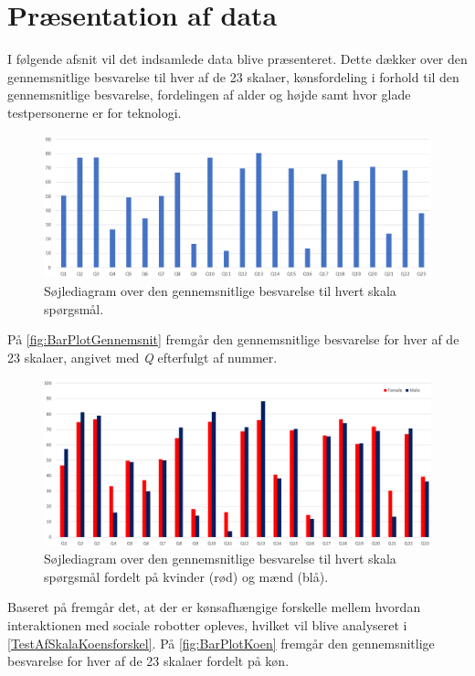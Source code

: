 \section{Præsentation af data}
\label{TestAfSkalaPraesentationAfData}
%
I følgende afsnit vil det indsamlede data blive præsenteret. Dette dækker over den gennemsnitlige besvarelse til hver af de 23 skalaer, kønsfordeling i forhold til den gennemsnitlige besvarelse, fordelingen af alder og højde samt hvor glade testpersonerne er for teknologi. 
%
\begin{figure}[H]
\centering
\includegraphics[width = \textwidth]{Figure/DatabehandlingSkalaer/BarPlotRaaData} 
\caption{Søjlediagram over den gennemsnitlige besvarelse til hvert skala spørgsmål.}
\label{fig:BarPlotGennemsnit}
\end{figure}
\noindent
%
På \autoref{fig:BarPlotGennemsnit} fremgår den gennemsnitlige besvarelse for hver af de 23 skalaer, angivet med \textit{Q} efterfulgt af nummer.
%
\begin{figure}[H]
\centering
\includegraphics[width = \textwidth]{Figure/DatabehandlingSkalaer/KoenGennemnitligBesvarelser} 
\caption{Søjlediagram over den gennemsnitlige besvarelse til hvert skala spørgsmål fordelt på kvinder (rød) og mænd (blå).}
\label{fig:BarPlotKoen}
\end{figure}
\noindent
%
Baseret på  fremgår det, at der er kønsafhængige forskelle mellem hvordan interaktionen med sociale robotter opleves, hvilket vil blive analyseret i \autoref{TestAfSkalaKoensforskel}. På \autoref{fig:BarPlotKoen} fremgår den gennemsnitlige besvarelse for hver af de 23 skalaer fordelt på køn.    
